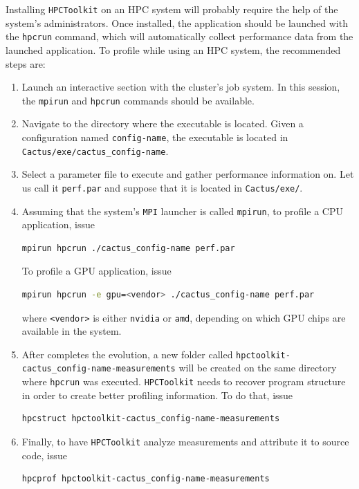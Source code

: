 Installing \texttt{HPCToolkit} on an HPC system will probably require the help of the system's administrators. Once installed, the application should be launched with the \texttt{hpcrun} command, which will automatically collect performance data from the launched application. To profile \CarpetX\space while using an HPC system, the recommended steps are:
%
\begin{enumerate}
  \item Launch an interactive section with the cluster's job system. In this session, the \texttt{mpirun} and \texttt{hpcrun} commands should be available.
  
  \item Navigate to the directory where the \Cactus\space executable is located. Given a configuration named \texttt{config-name}, the executable is located in \texttt{Cactus/exe/cactus\_config-name}.
  
  \item Select a parameter file to execute and gather performance information on. Let us call it \texttt{perf.par} and suppose that it is located in \texttt{Cactus/exe/}.
  
  \item Assuming that the system's \texttt{MPI} launcher is called \texttt{mpirun}, to profile a CPU application, issue
  \begin{lstlisting}[language=bash]
    mpirun hpcrun ./cactus_config-name perf.par
  \end{lstlisting}
  To profile a GPU application, issue
  \begin{lstlisting}[language=bash]
    mpirun hpcrun -e gpu=<vendor> ./cactus_config-name perf.par
  \end{lstlisting}
  where \texttt{<vendor>} is either \texttt{nvidia} or \texttt{amd}, depending on which GPU chips are available in the system.

  \item After \Cactus\space completes the evolution, a new folder called \texttt{hpctoolkit-cactus\_config-name-measurements} will be created on the same directory where \texttt{hpcrun} was executed. \texttt{HPCToolkit} needs to recover program structure in order to create better profiling information. To do that, issue
  \begin{lstlisting}[language=bash]
    hpcstruct hpctoolkit-cactus_config-name-measurements
  \end{lstlisting}

  \item Finally, to have \texttt{HPCToolkit} analyze measurements and attribute it to source code, issue
  \begin{lstlisting}[language=bash]
    hpcprof hpctoolkit-cactus_config-name-measurements
  \end{lstlisting}
\end{enumerate}

